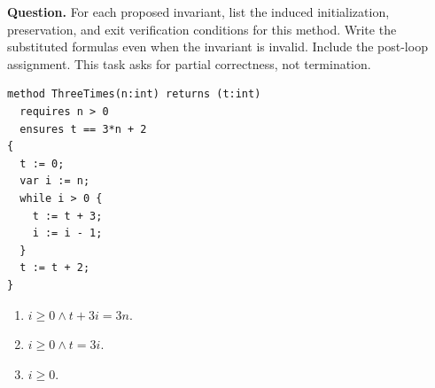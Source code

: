 


\mockrules
\textbf{Question.} For each proposed invariant, list the induced initialization,
preservation, and exit verification conditions for this method. Write the
substituted formulas even when the invariant is invalid. Include the post-loop
assignment. This task asks for partial correctness, not termination.
\par\noindent\begin{minipage}{\linewidth}
\begin{lstlisting}
method ThreeTimes(n:int) returns (t:int)
  requires n > 0
  ensures t == 3*n + 2
{
  t := 0;
  var i := n;
  while i > 0 {
    t := t + 3;
    i := i - 1;
  }
  t := t + 2;
}
\end{lstlisting}
\end{minipage}\par
\begin{enumerate}[label=(\alph*)]
\item $i\geq0\land t+3i=3n$.
\item $i\geq0\land t=3i$.
\item $i\geq0$.
\end{enumerate}


